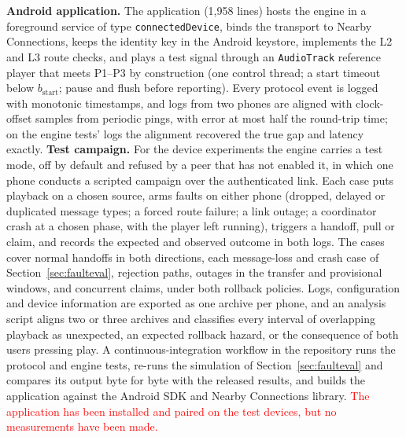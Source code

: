 \documentclass[conference]{IEEEtran}
\newcommand{\draftnote}[1]{\textcolor{red}{#1}}
\begin{document}
\textbf{Android application.} The application (1{,}958 lines) hosts the engine in a foreground service of type \texttt{connectedDevice}, binds the transport to Nearby Connections, keeps the identity key in the Android keystore, implements the L2 and L3 route checks, and plays a test signal through an \texttt{AudioTrack} reference player that meets P1--P3 by construction (one control thread; a start timeout below $b_{\mathrm{start}}$; pause and flush before reporting). Every protocol event is logged with monotonic timestamps, and logs from two phones are aligned with clock-offset samples from periodic pings, with error at most half the round-trip time; on the engine tests' logs the alignment recovered the true gap and latency exactly. \textbf{Test campaign.} For the device experiments the engine carries a test mode, off by default and refused by a peer that has not enabled it, in which one phone conducts a scripted campaign over the authenticated link. Each case puts playback on a chosen source, arms faults on either phone (dropped, delayed or duplicated message types; a forced route failure; a link outage; a coordinator crash at a chosen phase, with the player left running), triggers a handoff, pull or claim, and records the expected and observed outcome in both logs. The cases cover normal handoffs in both directions, each message-loss and crash case of Section~\ref{sec:faulteval}, rejection paths, outages in the transfer and provisional windows, and concurrent claims, under both rollback policies. Logs, configuration and device information are exported as one archive per phone, and an analysis script aligns two or three archives and classifies every interval of overlapping playback as unexpected, an expected rollback hazard, or the consequence of both users pressing play. A continuous-integration workflow in the repository runs the protocol and engine tests, re-runs the simulation of Section~\ref{sec:faulteval} and compares its output byte for byte with the released results, and builds the application against the Android SDK and Nearby Connections library. \draftnote{The application has been installed and paired on the test devices, but no measurements have been made.}
\end{document}
